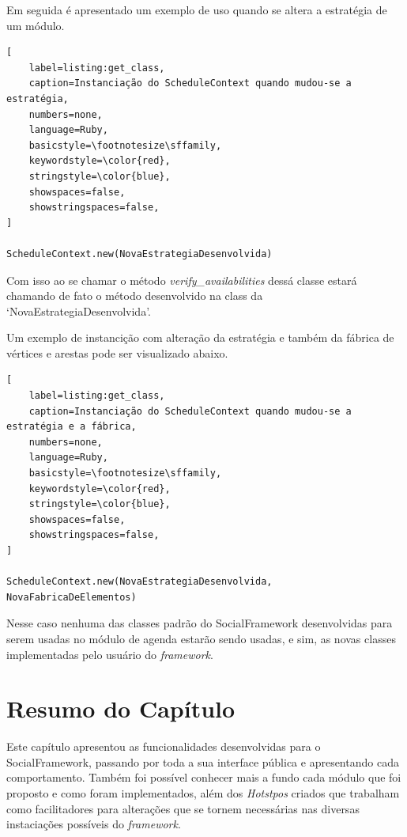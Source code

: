 Em seguida é apresentado um exemplo de uso quando se altera a estratégia de um módulo.

\begin{lstlisting}[
    label=listing:get_class,
    caption=Instanciação do ScheduleContext quando mudou-se a estratégia,
    numbers=none,
    language=Ruby,
    basicstyle=\footnotesize\sffamily,
    keywordstyle=\color{red},
    stringstyle=\color{blue},
    showspaces=false,
    showstringspaces=false,
]

ScheduleContext.new(NovaEstrategiaDesenvolvida)
\end{lstlisting}

Com isso ao se chamar o método \textit{verify\_availabilities} dessá classe estará chamando de fato o método desenvolvido na class da `NovaEstrategiaDesenvolvida'.

Um exemplo de instancição com alteração da estratégia e também da fábrica de vértices e arestas pode ser visualizado abaixo.

\begin{lstlisting}[
    label=listing:get_class,
    caption=Instanciação do ScheduleContext quando mudou-se a estratégia e a fábrica,
    numbers=none,
    language=Ruby,
    basicstyle=\footnotesize\sffamily,
    keywordstyle=\color{red},
    stringstyle=\color{blue},
    showspaces=false,
    showstringspaces=false,
]

ScheduleContext.new(NovaEstrategiaDesenvolvida, NovaFabricaDeElementos)
\end{lstlisting}

Nesse caso nenhuma das classes padrão do SocialFramework desenvolvidas para serem usadas no módulo de agenda estarão sendo usadas, e sim, as novas classes implementadas pelo usuário do \textit{framework}.

\section{Resumo do Capítulo}

Este capítulo apresentou as funcionalidades desenvolvidas para o SocialFramework, passando por toda a sua interface pública e apresentando cada comportamento. Também foi possível conhecer mais a fundo cada módulo que foi proposto e como foram implementados, além dos \textit{Hotstpos} criados que trabalham como facilitadores para alterações que se tornem necessárias nas diversas instaciações possíveis do \textit{framework}.
